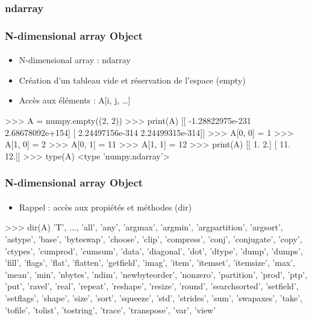 \subsubsection{ndarray}
\begin{frame}[fragile]
\frametitle{N-dimensional array Object}
\framesubtitle{}
\begin{itemize}
 \item N-dimensional array : ndarray
 \item Création d'un tableau vide et réservation de l'espace (empty)
 \item Accès aux éléments : A[i, j, \dots]
\end{itemize}
\begin{pythonConsole}

>>> A = numpy.empty((2, 2))
>>> print(A)
[[ -1.28822975e-231   2.68678092e+154]
 [  2.24497156e-314   2.24499315e-314]]
>>> A[0, 0] = 1
>>> A[1, 0] = 2
>>> A[0, 1] = 11
>>> A[1, 1] = 12
>>> print(A)
[[  1.   2.]
 [ 11.  12.]]
>>> type(A)
<type 'numpy.ndarray'>
\end{pythonConsole}
\end{frame}
\begin{frame}[fragile]
\frametitle{N-dimensional array Object}
\framesubtitle{}
\begin{itemize}
 \item Rappel : accès aux propiétés et méthodes (dir) 
\end{itemize}
\begin{pythonConsole}

>>> dir(A)
'T', ..., 'all', 'any', 'argmax', 'argmin', 'argpartition', 'argsort', 'astype',
'base', 'byteswap', 'choose', 'clip', 'compress', 'conj', 'conjugate', 'copy',
'ctypes', 'cumprod', 'cumsum', 'data', 'diagonal', 'dot', 'dtype', 'dump',
'dumps', 'fill', 'flags', 'flat', 'flatten', 'getfield', 'imag', 'item',
'itemset', 'itemsize', 'max', 'mean', 'min', 'nbytes', 'ndim', 'newbyteorder',
'nonzero', 'partition', 'prod', 'ptp', 'put', 'ravel', 'real', 'repeat',
'reshape', 'resize', 'round', 'searchsorted', 'setfield', 'setflags', 'shape',
'size', 'sort', 'squeeze', 'std', 'strides', 'sum', 'swapaxes', 'take',
'tofile', 'tolist', 'tostring', 'trace', 'transpose', 'var', 'view'
\end{pythonConsole}
\end{frame}
